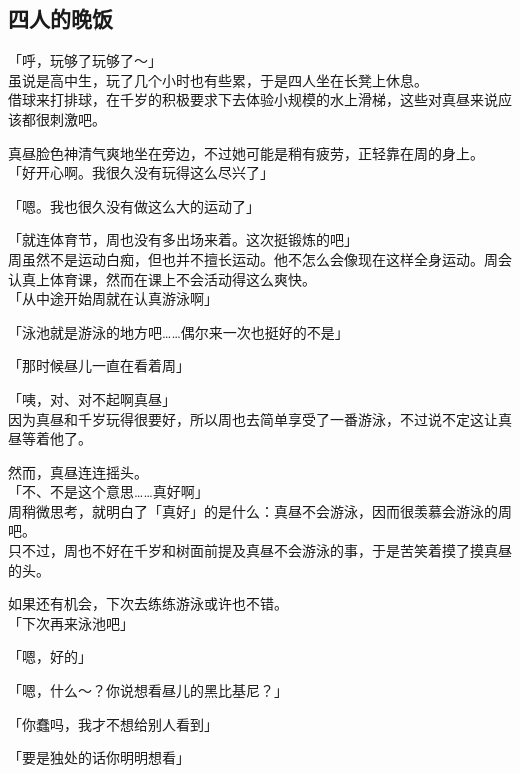 \subsection{四人的晚饭}

「呼，玩够了玩够了～」\\

虽说是高中生，玩了几个小时也有些累，于是四人坐在长凳上休息。\\

借球来打排球，在千岁的积极要求下去体验小规模的水上滑梯，这些对真昼来说应该都很刺激吧。

真昼脸色神清气爽地坐在旁边，不过她可能是稍有疲劳，正轻靠在周的身上。\\

「好开心啊。我很久没有玩得这么尽兴了」

「嗯。我也很久没有做这么大的运动了」

「就连体育节，周也没有多出场来着。这次挺锻炼的吧」\\

周虽然不是运动白痴，但也并不擅长运动。他不怎么会像现在这样全身运动。周会认真上体育课，然而在课上不会活动得这么爽快。\\

「从中途开始周就在认真游泳啊」

「泳池就是游泳的地方吧……偶尔来一次也挺好的不是」

「那时候昼儿一直在看着周」

「咦，对、对不起啊真昼」\\

因为真昼和千岁玩得很要好，所以周也去简单享受了一番游泳，不过说不定这让真昼等着他了。

然而，真昼连连摇头。\\

「不、不是这个意思……真好啊」\\

周稍微思考，就明白了「真好」的是什么：真昼不会游泳，因而很羡慕会游泳的周吧。\\

只不过，周也不好在千岁和树面前提及真昼不会游泳的事，于是苦笑着摸了摸真昼的头。

如果还有机会，下次去练练游泳或许也不错。\\

「下次再来泳池吧」

「嗯，好的」

「嗯，什么～？你说想看昼儿的黑比基尼？」

「你蠢吗，我才不想给别人看到」

「要是独处的话你明明想看」

